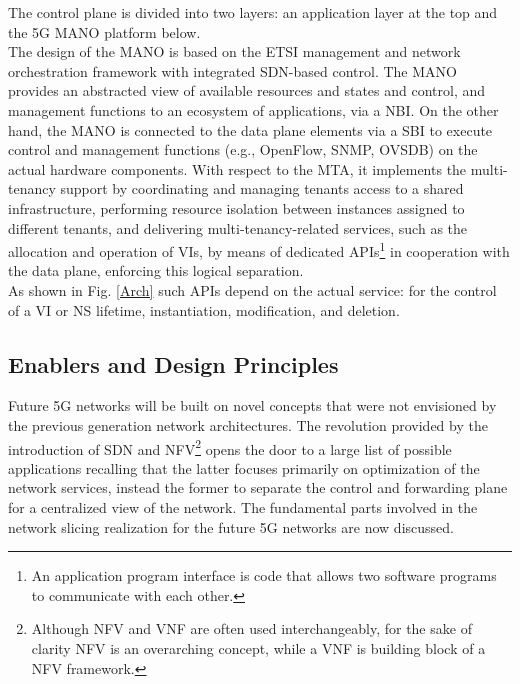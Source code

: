 \documentclass{report}
\begin{document}
The control plane is divided into two layers: an application layer at the top and the 5G \gls{MANO} platform below. \\
The design of the MANO is based on the ETSI management and network orchestration framework with integrated SDN-based control. The MANO
provides an abstracted view of available resources and states and control, and
management functions to an ecosystem of applications, via a \gls{NBI}. On the other hand, the MANO is connected to the data plane
elements via a \gls{SBI} to execute control and management
functions (e.g., OpenFlow, SNMP, OVSDB) on the actual hardware components.
With respect to the \gls{MTA}, it implements the
multi-tenancy support by coordinating and managing tenants access to a shared
infrastructure, performing resource isolation between instances assigned to
different tenants, and delivering multi-tenancy-related services, such as the
allocation and operation of VIs, by means of dedicated \gls{API}s\footnote{An application program interface is code that allows two software programs to communicate with each other.} in cooperation
with the data plane, enforcing this logical separation. \\
As shown in Fig. \ref{Arch}
such APIs depend on the actual service: for the control of a VI or NS lifetime,
instantiation, modification, and deletion.

\subsection{Enablers and Design Principles}
Future 5G networks will be built on novel concepts that were not envisioned by the previous generation
network architectures. The revolution provided by the introduction of SDN
and \gls{NFV}\footnote{Although NFV and VNF are often used interchangeably, for the sake of clarity NFV is an overarching concept, while a VNF is building block of a NFV framework.} opens the door to a
large list of possible applications recalling that the latter focuses primarily on optimization of the network services, instead the former to separate the control and forwarding plane for a centralized view of the network. The fundamental parts involved in the network slicing realization for the future 5G networks are now discussed.
\end{document}
